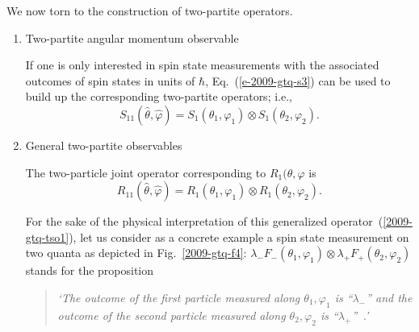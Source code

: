 \documentclass[pra,amsfonts,showpacs,showkeys,preprint]{revtex4}
\begin{document}
We now torn to the construction of two-partite operators.
\begin{enumerate}

\item{Two-partite angular momentum observable}

If one is only interested in spin state measurements with the associated outcomes of spin states in units of $\hbar$,
Eq.~(\ref{e-2009-gtq-s3}) can be used to build up the corresponding two-partite operators; i.e.,
\begin{equation}
 S_{1 1 } ({\hat \theta},{\hat \varphi} ) =
S_{1 }( \theta_1,\varphi_1 )
\otimes
S_{1 }( \theta_2,\varphi_2 ).
\label{2004-gtq-e3F3nat}
\end{equation}


\item{General two-partite observables}

The two-particle joint operator corresponding to $R_1(\theta ,\varphi$ is
\begin{equation}
\label{2009-gtq-tso1}
R_{11}(\hat \theta ,\hat \varphi) = R_1(\theta_1 ,\varphi_1)\otimes R_1(\theta_2 ,\varphi_2)
.
\end{equation}

For the sake of the physical interpretation of this generalized operator~(\ref{2009-gtq-tso1}), let us consider as a concrete example
a spin state measurement on two quanta as depicted in Fig.~\ref{2009-gtq-f4}:
$\lambda_{-} F_{-}(\theta_1 ,\varphi_1)\otimes  \lambda_{+} F_{+}(\theta_2 ,\varphi_2 )$  stands for the proposition
\begin{quote}
{\em `The outcome of the first particle measured along $\theta_1,\varphi_1$ is ``$\lambda_-$''
      and
      the outcome of the second particle measured along $\theta_2,\varphi_2$ is ``$\lambda_+$''~.'
}
\end{quote}


\end{enumerate}
\end{document}
